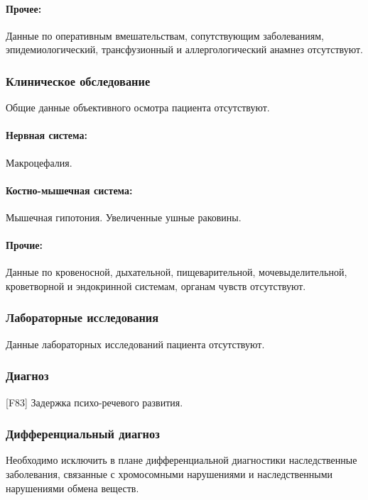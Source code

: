 \documentclass[a4paper,14pt]{extarticle}
\newcommand{\DS}[2]{[#2] #1}
\begin{document}
\paragraph{Прочее:} Данные по оперативным вмешательствам, сопутствующим заболеваниям, эпидемиологический, трансфузионный и аллергологический анамнез отсутствуют.

\subsubsection*{Клиническое обследование}

Общие данные объективного осмотра пациента отсутствуют.

\paragraph{Нервная система:} Макроцефалия.

\paragraph{Костно-мышечная система:} Мышечная гипотония. Увеличенные ушные раковины.

\paragraph{Прочие:} Данные по кровеносной, дыхательной, пищеварительной, мочевыделительной, кроветворной и эндокринной системам, органам чувств отсутствуют.

\subsubsection*{Лабораторные исследования}

Данные лабораторных исследований пациента отсутствуют.

\subsubsection*{Диагноз}

\DS{Задержка психо-речевого развития}{F83}.

\subsubsection*{Дифференциальный диагноз}

Необходимо исключить в плане дифференциальной диагностики наследственные заболевания, связанные с хромосомными нарушениями и наследственными нарушениями обмена  веществ. 
\end{document}
